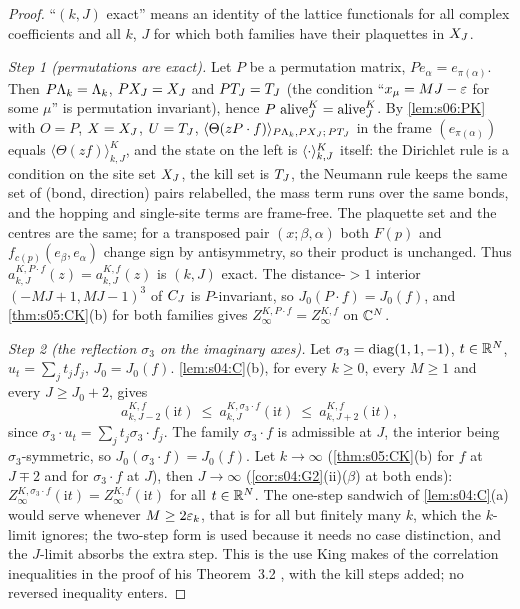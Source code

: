 \begin{proof}
``$(k,J)$ exact'' means an identity of the lattice functionals for all complex coefficients and all $k$, $J$ for which both families have their plaquettes in $X_J$.

\emph{Step 1 (permutations are exact).} Let $P$ be a permutation matrix, $Pe_\alpha=e_{\pi(\alpha)}$. Then $P\Lambda_k=\Lambda_k$, $PX_J=X_J$ and $PT_J=T_J$ (the condition ``$x_\mu=MJ-\varepsilon$ for some $\mu$'' is permutation invariant), hence $P\,\operatorname{alive}^K_J=\operatorname{alive}^K_J$. By \cref{lem:s06:PK} with $O=P$, $X=X_J$, $U=T_J$, $\langle\Theta(zP\cdot f)\rangle_{P\Lambda_k,PX_J;\,PT_J}$ in the frame $(e_{\pi(\alpha)})$ equals $\langle\Theta(zf)\rangle^K_{k,J}$, and the state on the left is $\langle \cdot\rangle^K_{k,J}$ itself: the Dirichlet rule is a condition on the site set $X_J$, the kill set is $T_J$, the Neumann rule keeps the same set of (bond, direction) pairs relabelled, the mass term runs over the same bonds, and the hopping and single-site terms are frame-free. The plaquette set and the centres are the same; for a transposed pair $(x;\beta,\alpha)$ both $F(p)$ and $f_{c(p)}(e_\beta,e_\alpha)$ change sign by antisymmetry, so their product is unchanged. Thus $a^{K,P\cdot f}_{k,J}(z)=a^{K,f}_{k,J}(z)$ is $(k,J)$ exact. The distance-$>1$ interior $(-MJ+1,MJ-1)^3$ of $C_J$ is $P$-invariant, so $J_0(P\cdot f)=J_0(f)$, and \cref{thm:s05:CK}(b) for both families gives $Z^{K,P\cdot f}_\infty=Z^{K,f}_\infty$ on $\mathbb C^N$.

\emph{Step 2 (the reflection $\sigma_3$ on the imaginary axes).} Let $\sigma_3=\operatorname{diag}(1,1,-1)$, $t\in\mathbb R^N$, $u_t=\sum_jt_jf_j$, $J_0=J_0(f)$. \cref{lem:s04:C}(b), for every $k\ge0$, every $M\ge1$ and every $J\ge J_0+2$, gives
\[
a^{K,f}_{k,J-2}(\mathrm it)\ \le\ a^{K,\sigma_3\cdot f}_{k,J}(\mathrm it)\ \le\ a^{K,f}_{k,J+2}(\mathrm it),
\]
since $\sigma_3\cdot u_t=\sum_jt_j\sigma_3\cdot f_j$. The family $\sigma_3\cdot f$ is admissible at $J$, the interior being $\sigma_3$-symmetric, so $J_0(\sigma_3\cdot f)=J_0(f)$. Let $k\to\infty$ (\cref{thm:s05:CK}(b) for $f$ at $J\mp2$ and for $\sigma_3\cdot f$ at $J$), then $J\to\infty$ (\cref{cor:s04:G2}(ii)($\beta$) at both ends): $Z^{K,\sigma_3\cdot f}_\infty(\mathrm it)=Z^{K,f}_\infty(\mathrm it)$ for all $t\in\mathbb R^N$. The one-step sandwich of \cref{lem:s04:C}(a) would serve whenever $M\ge2\varepsilon_k$, that is for all but finitely many $k$, which the $k$-limit ignores; the two-step form is used because it needs no case distinction, and the $J$-limit absorbs the extra step. This is the use King makes of the correlation inequalities in the proof of his Theorem~3.2 \cite{K2}, with the kill steps added; no reversed inequality enters.


\end{proof}
